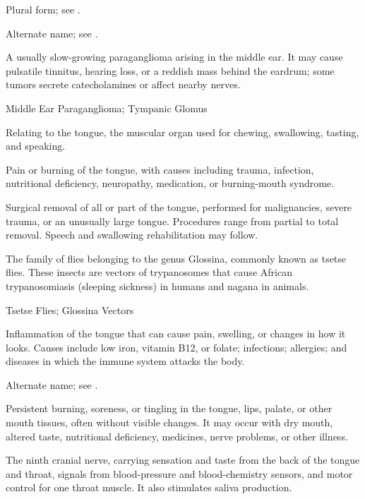  Plural form; see .

 Alternate name; see .

 A usually slow-growing paraganglioma arising in the middle ear. It may cause pulsatile tinnitus, hearing loss, or a reddish mass behind the eardrum; some tumors secrete catecholamines or affect nearby nerves.

\synonyms
Middle Ear Paraganglioma; Tympanic Glomus

 Relating to the tongue, the muscular organ used for chewing, swallowing, tasting, and speaking.

 Pain or burning of the tongue, with causes including trauma, infection, nutritional deficiency, neuropathy, medication, or burning-mouth syndrome.

 Surgical removal of all or part of the tongue, performed for malignancies, severe trauma, or an unusually large tongue. Procedures range from partial to total removal. Speech and swallowing rehabilitation may follow.

 The family of flies belonging to the genus Glossina, commonly known as tsetse flies. These insects are vectors of trypanosomes that cause African trypanosomiasis (sleeping sickness) in humans and nagana in animals.

\synonyms
Tsetse Flies; Glossina Vectors

 Inflammation of the tongue that can cause pain, swelling, or changes in how it looks. Causes include low iron, vitamin B12, or folate; infections; allergies; and diseases in which the immune system attacks the body.

 Alternate name; see .

 Persistent burning, soreness, or tingling in the tongue, lips, palate, or other mouth tissues, often without visible changes. It may occur with dry mouth, altered taste, nutritional deficiency, medicines, nerve problems, or other illness.

 The ninth cranial nerve, carrying sensation and taste from the back of the tongue and throat, signals from blood-pressure and blood-chemistry sensors, and motor control for one throat muscle. It also stimulates saliva production.

